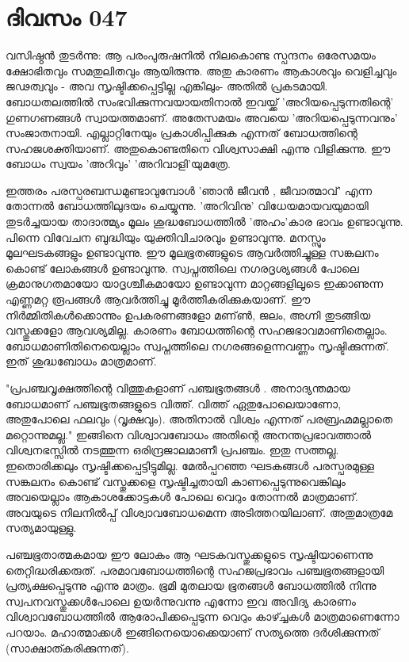  
\section{ദിവസം 047}


വസിഷ്ഠന്‍ തുടര്‍ന്നു: ആ പരംപുരുഷനില്‍ നിലകൊണ്ട  സ്പന്ദനം ഒരേസമയം ക്ഷോഭിതവും സമതുലിതവും ആയിരുന്നു. അതു കാരണം ആകാശവും വെളിച്ചവും ജഢത്വവും - അവ സൃഷ്ടിക്കപ്പെട്ടില്ല എങ്കിലും- അതില്‍ പ്രകടമായി. ബോധതലത്തില്‍ സംഭവിക്കുന്നവയായതിനാല്‍ ഇവയ്ക്ക്‌ 'അറിയപ്പെടുന്നതിന്റെ' ഗുണഗണങ്ങള്‍ സ്വായത്തമാണ്‌. അതേസമയം അവയെ 'അറിയപ്പെടുന്നവനും' സംജാതനായി. എല്ലാറ്റിനേയും പ്രകാശിപ്പിക്കുക എന്നത്‌ ബോധത്തിന്റെ സഹജശക്തിയാണ്‌. അതുകൊണ്ടതിനെ വിശ്വസാക്ഷി എന്നു വിളിക്കുന്നു. ഈ ബോധം സ്വയം 'അറിവും' 'അറിവാളി'യുമത്രേ. 

ഇത്തരം പരസ്പരബന്ധമുണ്ടാവുമ്പോള്‍ 'ഞാന്‍ ജീവന്‍ , ജീവാത്മാവ്‌' എന്ന തോന്നല്‍ ബോധത്തിലുദയം ചെയ്യുന്നു. 'അറിവിനു' വിധേയമായവയുമായി തുടര്‍ച്ചയായ താദാത്മ്യം മൂലം ശുദ്ധബോധത്തില്‍ 'അഹം'കാര ഭാവം ഉണ്ടാവുന്നു. പിന്നെ വിവേചന ബുദ്ധിയും യുക്തിവിചാരവും ഉണ്ടാവുന്നു. മനസ്സും മൂലഘടകങ്ങളും ഉണ്ടാവുന്നു. ഈ മൂലഭൂതങ്ങളുടെ ആവര്‍ത്തിച്ചുള്ള സങ്കലനം കൊണ്ട്‌ ലോകങ്ങള്‍ ഉണ്ടാവുന്നു. സ്വപ്നത്തിലെ നഗരദൃശ്യങ്ങള്‍ പോലെ ക്രമാനുഗതമായോ യാദൃശ്ചീകമായോ ഉണ്ടാവുന്ന മാറ്റങ്ങളിലൂടെ ഇക്കാണുന്ന എണ്ണമറ്റ രൂപങ്ങള്‍ ആവര്‍ത്തിച്ചു മൂര്‍ത്തീകരിക്കുകയാണ്‌. ഈ നിര്‍മ്മിതികള്‍ക്കൊന്നും ഉപകരണങ്ങളോ മണ്ണ്‍, ജലം, അഗ്നി തുടങ്ങിയ വസ്തുക്കളോ ആവശ്യമില്ല. കാരണം ബോധത്തിന്റെ സഹജഭാവമാണിതെല്ലാം. ബോധമാണിതിനെയെല്ലാം സ്വപ്നത്തിലെ നഗരങ്ങളെന്നവണ്ണം സൃഷ്ടിക്കുന്നത്‌. ഇത്‌ ശുദ്ധബോധം മാത്രമാണ്‌.

"പ്രപഞ്ചവൃക്ഷത്തിന്റെ വിത്തുകളാണ്‌ പഞ്ചഭൂതങ്ങള്‍ . അനാദ്യന്തമായ ബോധമാണ്‌ പഞ്ചഭൂതങ്ങളുടെ വിത്ത്‌. വിത്ത്‌ ഏതുപോലെയാണോ, അതുപോലെ ഫലവും (വൃക്ഷവും). അതിനാല്‍ വിശ്വം എന്നത്‌ പരബ്രഹ്മമല്ലാതെ മറ്റൊന്നുമല്ല." ഇങ്ങിനെ വിശ്വാവബോധം അതിന്റെ അനന്തപ്രഭാവത്താല്‍ വിശ്വനഭസ്സില്‍ നടത്തുന്ന ഒരിന്ദ്രജാലമാണീ പ്രപഞ്ചം. ഇതു സത്തല്ല. ഇതൊരിക്കലും സൃഷ്ടിക്കപ്പെട്ടിട്ടുമില്ല. മേല്‍പ്പറഞ്ഞ ഘടകങ്ങള്‍ പരസ്പരമുള്ള സങ്കലനം കൊണ്ട്‌ വസ്തുക്കളെ സൃഷ്ടിച്ചതായി കാണപ്പെടുന്നുവെങ്കിലും അവയെല്ലാം ആകാശക്കോട്ടകള്‍ പോലെ വെറും തോന്നല്‍ മാത്രമാണ്‌. അവയുടെ നിലനില്‍പ്പ്‌ വിശ്വാവബോധമെന്ന അടിത്തറയിലാണ്‌. അതുമാത്രമേ സത്യമായുള്ളു. 

പഞ്ചഭൂതാത്മകമായ ഈ ലോകം ആ ഘടകവസ്തുക്കളുടെ സൃഷ്ടിയാണെന്നു തെറ്റിദ്ധരിക്കരുത്‌. പരമാവബോധത്തിന്റെ സഹജപ്രഭാവം പഞ്ചഭൂതങ്ങളായി പ്രത്യക്ഷപ്പെടുന്നു എന്നു മാത്രം. ഭൂമി മുതലായ ഭൂതങ്ങള്‍ ബോധത്തില്‍ നിന്നു സ്വപനവസ്തുക്കള്‍പോലെ ഉയര്‍ന്നുവന്നു എന്നോ ഇവ അവിദ്യ കാരണം വിശ്വാവബോധത്തില്‍ ആരോപിക്കപ്പെടുന്ന വെറും കാഴ്ച്ചകള്‍ മാത്രമാണെന്നോ പറയാം. മഹാത്മാക്കള്‍ ഇങ്ങിനെയൊക്കെയാണ്‌ സത്യത്തെ ദര്‍ശിക്കുന്നത്‌ (സാക്ഷാത്കരിക്കുന്നത്‌).
